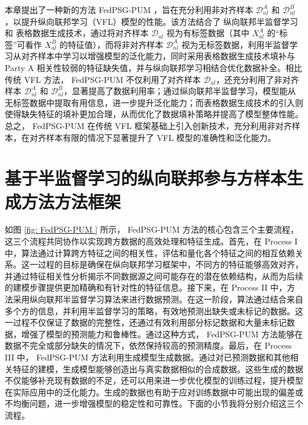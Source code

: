 本章提出了一种新的方法  FedPSG-PUM ，旨在充分利用非对齐样本 $\mathcal{D}^A_{nl}$ 和 $\mathcal{D}^B_{nl}$，以提升纵向联邦学习（VFL）模型的性能。该方法结合了 纵向联邦半监督学习 和 表格数据生成技术，通过将对齐样本 $\mathcal{D}_{al}$ 视为有标签数据（其中 $X^A_{al}$ 的“标签”可看作 $X^B_{al}$ 的特征值），而将非对齐样本 $\mathcal{D}^A_{nl}$ 视为无标签数据，利用半监督学习从对齐样本中学习以增强模型的泛化能力，同时采用表格数据生成技术填补与 Party A 相关性较弱的特征缺失值，并与纵向联邦学习相结合优化数据补全。相比传统 VFL 方法， FedPSG-PUM  不仅利用了对齐样本 $\mathcal{D}_{al}$，还充分利用了非对齐样本 $\mathcal{D}^A_{nl}$ 和 $\mathcal{D}^B_{nl}$，显著提高了数据利用率；通过纵向联邦半监督学习，模型能从无标签数据中提取有用信息，进一步提升泛化能力；而表格数据生成技术的引入则使得缺失特征的填补更加合理，从而优化了数据填补策略并提高了模型整体性能。总之， FedPSG-PUM  在传统 VFL 框架基础上引入创新技术，充分利用非对齐样本，在对齐样本有限的情况下显著提升了 VFL 模型的准确性和泛化能力。
\section{基于半监督学习的纵向联邦参与方样本生成方法方法框架}
如图 \ref{fig: FedPSG-PUM } 所示， FedPSG-PUM  方法的核心包含三个主要流程，这三个流程共同协作以实现跨方数据的高效处理和特征生成。首先，在 Process I 中，算法通过计算跨方特征之间的相关性，评估和量化各个特征之间的相互依赖关系。这一过程的目标是确保在纵向联邦学习框架中，不同方的特征能够高效对齐，并通过特征相关性分析揭示不同数据源之间可能存在的潜在依赖结构，从而为后续的建模步骤提供更加精确和有针对性的特征信息。接下来，在 Process II 中，方法采用纵向联邦半监督学习算法来进行数据预测。在这一阶段，算法通过结合来自多个方的信息，并利用半监督学习的策略，有效地预测出缺失或未标记的数据。这一过程不仅保证了数据的完整性，还通过有效利用部分标记数据和大量未标记数据，增强了模型的预测能力和鲁棒性。通过这种方式， FedPSG-PUM  方法能够在数据不完全或部分缺失的情况下，依然保持较高的预测精度。最后，在 Process III 中， FedPSG-PUM  方法利用生成模型生成数据。通过对已预测数据和其他相关特征的建模，生成模型能够创造出与真实数据相似的合成数据。这些生成的数据不仅能够补充现有数据的不足，还可以用来进一步优化模型的训练过程，提升模型在实际应用中的泛化能力。生成的数据也有助于应对训练数据中可能出现的偏差或不均衡问题，进一步增强模型的稳定性和可靠性。下面的小节我将分别介绍这三个流程。

